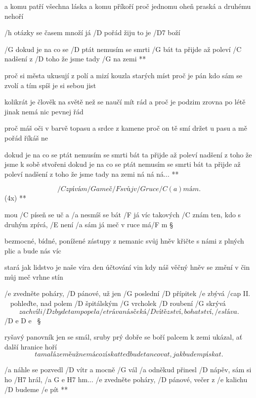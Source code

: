 a komu patří všechna láska a komu příkoří
proč jednomu oheň praská a druhému nehoří \s

/h otázky se časem množí já /D pořád žiju to je /D7 boží

\R  /G dokud je na co se /D ptát nemusím se smrti /G bát
    ta přijde až poleví /C nadšení z /D toho že jsme tady /G na zemi **

proč si města ukusují z polí a mizí kouzla starých míst
proč je pán kdo sám se zvolí a tím spíš je si sebou jist \s

kolikrát je člověk na světě než se naučí mít rád
a proč je podzim zrovna po létě jinak nemá nic pevnej řád \s

proč máš oči v barvě topasu a srdce z kamene
proč on tě smí držet u pasu a mě pořád říkáš ne

\R  dokud je na co se ptát nemusím se smrti bát
    ta přijde až poleví nadšení z toho že jsme k sobě stvořeni \s
    dokud je na co se ptát nemusím se smrti bát
    ta přijde až poleví nadšení z toho že jsme tady na zemi \s
    ná ná ná... **




\R \[ /C zpívám /G a meč /F svůj v /G ruce /{C (a)} mám. \](4x) **

mou /C píseň se uč a /a nesmíš se bát
/F já víc takových /C znám
ten, kdo s druhým zpívá, /E není /a sám
já meč v ruce má/F m \S

bezmocné, bídné, ponížené
zástupy z nemanic
svůj hněv křičte s námi z plných plic
a bude nás víc \s

stará jak lidstvo je naše víra
den účtování vin
kdy náš věčný hněv se změní v čin
můj meč vrhne stín \s




/e zvedněte poháry, /D pánové, už jen /G poslední /D přípitek /e zbývá /{cap II.} ~
pohleďte, nad polem /D špitálským /G vrcholek /D roubení /G skrývá
\[ za chvíli /D zbyde tam popel a /e tráva
    nás čeká /D vítězství, bohatství, /e sláva. \] /{D e D e} ~\S

ryšavý panovník jen se smál, sruby prý dobře se boří
palcem k zemi ukázal, ať další hranice hoří
\[ ta malá země už nemá co získat
teď bude tancovat, jak budem pískat. \]

\R  /a náhle se pozvedl /D vítr a mocně /G vál
    /a odněkud přinesl /D nápěv, sám si ho /H7 hrál, /{a G e H7} hm...
    /e zvedněte poháry, /D pánové, večer z /e kalichu /D budeme /e pít **


